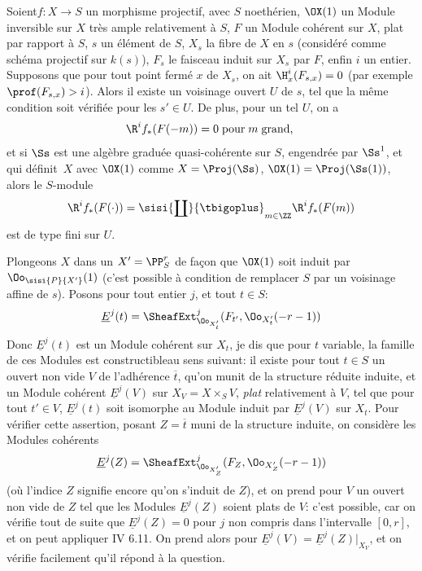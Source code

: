\begin{proposition} \label{XII.1.5}
Soient\pageoriginaled $f:X\to S$ un morphisme projectif, avec $S$ noeth\'erien, $\OX(1)$ un Module inversible sur $X$ tr\`es ample relativement \`a $S$, $F$ un Module coh\'erent sur $X$, plat par rapport \`a $S$, $s$ un \'el\'ement de $S$, $X_s$ la fibre de $X$ en $s$ (consid\'er\'e comme sch\'ema projectif sur $k(s)$), $F_s$ le faisceau induit sur $X_s$ par $F$, enfin $i$ un entier. Supposons que pour tout point ferm\'e $x$ de $X_s$, on ait $\H^i_x(F_{s, x})=0$ (par exemple $\prof(F_{s, x})>i$). Alors il existe un voisinage ouvert $U$ de $s$, tel que la m\^eme condition soit v\'erifi\'ee pour les $s'\in U$. De plus, pour un tel $U$, on a
\[
\R^if_\ast(F(-m))= 0 \; \text{pour}\; m \; \text{grand, }
\]
et si $\Ss$ est une alg\`ebre gradu\'ee quasi-coh\'erente sur $S$, engendr\'ee par $\Ss^1$, et qui d\'efinit~$X$ avec $\OX(1)$ comme $X=\Proj(\Ss)$, $\OX(1)=\Proj(\Ss(1))$, alors le $S$-module
\[
\R^if_\ast(F(\cdot)) = \sisi{\coprod}{\tbigoplus}_{m\in\ZZ}\R^if_\ast(F(m))
\]
est de type fini sur $U$.
\end{proposition}

Plongeons $X$ dans un $X'=\PP_S^r$ de fa\c con que $\OX(1)$ soit induit par $\Oo_{\sisi{P}{{X'}}}(1)$ (c'est possible \`a condition de remplacer $S$ par un voisinage affine de $s$). Posons\label{P5} pour tout entier $j$, et tout $t\in S$:
\steco
\begin{equation} \label{eq:XII.7} {}\underline{E}^j(t)= \SheafExt^j_{\Oo_{X'_t}} (F_{t'}, \Oo_{X'_t}(-r-1))
\end{equation}
Donc $\underline{E}^j(t)$ est un Module coh\'erent sur $X_t$, je dis que pour $t$ variable, la famille de ces Modules est \og constructible\fg au sens suivant: il existe pour tout $t\in S$ un ouvert non vide $V$ de l'adh\'erence $\overline{t}$, qu'on munit de la structure r\'eduite induite, et un Module coh\'erent $\underline{E}^j(V)$ sur $X_V=X\times_SV$, \emph{plat} relativement \`a $V$, tel que pour tout $t'\in V$, $\underline{E}^j(t)$ soit isomorphe au Module induit par $\underline{E}^j(V)$ sur $X_t$. Pour v\'erifier cette assertion, posant $Z=\overline{t}$ muni de la structure induite, on consid\`ere les Modules coh\'erents\pageoriginale
\[
\underline{E}^j(Z)= \SheafExt^j_{\Oo_{X'_Z}} (F_Z, \Oo_{X'_Z}(-r-1))
\]
(o\`u l'indice $Z$ signifie encore qu'on s'induit  de $Z$), et on prend pour $V$ un ouvert non vide de $Z$ tel que les Modules $\underline{E}^j(Z)$ soient plats  de $V$: c'est possible, car on v\'erifie tout de suite que $\underline{E}^j(Z)=0$ pour $j$ non compris dans l'intervalle $[0, r]$, et on peut appliquer  IV 6.11. On prend alors pour $\underline{E}^j(V)=\underline{E}^j(Z)|_{X_V}$, et on v\'erifie facilement qu'il r\'epond \`a la question.


